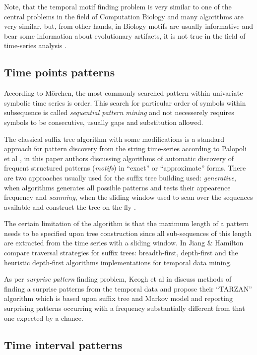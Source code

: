 Note, that the temporal motif finding problem is very similar to one of the central problems in the field of Computation Biology \cite{citeulike:465665} and many algorithms are very similar, but, from other hands, in Biology motifs are usually informative and bear some information about evolutionary artifacts, it is not true in the field of time-series analysis \cite{citeulike:3978085}.

\subsection{Time points patterns}
According to M\"orchen, the most commonly searched pattern within univariate symbolic time series is order. This search for particular order of symbols within subsequence is called \textit{sequential pattern mining} \cite{citeulike:775528} and not necesserely requires symbols to be consecutive, usually gaps and substitution allowed.

The classical suffix tree algorithm \cite{citeulike:707616} with some modifications is a standard approach for pattern discovery from the string time-series according to Palopoli et al \cite{citeulike:5003338}, in this paper authors discussing algorithms of automatic discovery of frequent structured patterns (\textit{motifs}) in ``exact'' or ``approximate'' forms. There are two approaches usually used for the suffix tree building used: \textit{generative}, when algorithms generates all possible patterns and tests their appearence frequency \cite{citeulike:5012661} and \textit{scanning}, when the sliding window used to scan over the sequences available and construct the tree on the fly \cite{citeulike:5012661}. 

The certain limitation of the algorithm is that the maximum length of a pattern needs to be specified upon tree construction since all sub-sequences of this length are extracted from the time series with a sliding window. In \cite{citeulike:5003404} Jiang \& Hamilton compare traversal strategies for suffix trees: breadth-first, depth-first and the heuristic depth-first algorithms implementations for temporal data mining.

As per \textit{surprise pattern} finding problem, Keogh et al in \cite{citeulike:3025877} discuss methods of finding a surprise patterns from the temporal data and propose their ``TARZAN'' algorithm which is based upon suffix tree and Markov model and reporting surprising patterns occurring with a frequency substantially different from that one expected by a chance.

\subsection{Time interval patterns}


